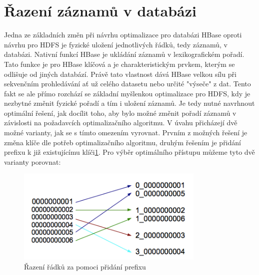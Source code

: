 \documentclass[thesis=M,czech]{FITthesis}[2012/06/26]
\begin{document}
\section{Řazení záznamů v databázi}
Jedna ze základních změn při návrhu optimalizace pro databázi HBase oproti návrhu pro HDFS je fyzické uložení jednotlivých řádků, tedy záznamů, v databázi. Nativní funkcí HBase je ukládání záznamů v lexikografickém pořadí. Tato funkce je pro HBase klíčová a je charakteristickým prvkem, kterým se odlišuje od jiných databází. Právě tato vlastnost dává HBase velkou sílu při sekvenčním prohledávání ať už celého datasetu nebo určité "výseče" z dat. Tento fakt se ale přímo rozchází se základní myšlenkou optimalizace pro HDFS, kdy je nezbytné změnit fyzické pořadí a tím i uložení záznamů. 
Je tedy nutné navrhnout optimální řešení, jak docílit toho, aby bylo možné změnit pořadí záznamů v závislosti na požadavcích optimalizačního algoritmu. V úvahu přicházejí dvě možné varianty, jak se s tímto omezením vyrovnat. Prvním z možných řešení je změna klíče dle potřeb optimalizačního algoritmu, druhým řešením je přidání prefixu k již existujícímu klíči\ref{fig:keys}. Pro výběr optimálního přístupu můžeme tyto dvě varianty porovnat:

\begin{figure}\centering
	\includegraphics[width=0.8\textwidth, angle=0]{files/rows}
	\caption[Řazení řádků za pomoci přidání prefixu]
	{Řazení řádků za pomoci přidání prefixu}\label{fig:keys}
\end{figure} 
\end{document}
